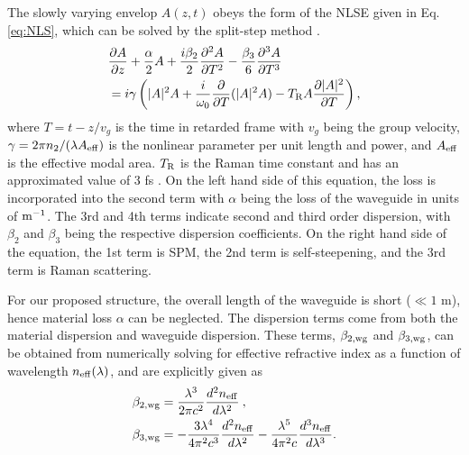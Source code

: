 The slowly varying envelop $A(z,t)$ obeys the form of the NLSE given in Eq. \ref{eq:NLS}, which can be solved by the split-step method \cite{weideman1986split}.
\begin{align}
\begin{split}
&\frac{\partial A}{\partial z}+\frac{\alpha}{2}A+\frac{i\beta_2}{2}\frac{\partial^2A}{\partial T^2}-\frac{\beta_3}{6}\frac{\partial^3 A}{\partial T^3}\\
&=i\gamma \left(|A|^2A+\frac{i}{\omega_0}\frac{\partial}{\partial T}(|A|^2A)-T_{\rm{R}}A\frac{\partial |A|^2}{\partial T}\right),
\label{eq:NLS}
\end{split}
\end{align}
where $T=t-z/v_g$ is the time in retarded frame with $v_g$ being the group velocity, $\gamma=2\pi n_2/(\lambda A_{\rm{eff}})$ is the nonlinear parameter per unit length and power, and $A_{\rm{eff}}$ is the effective modal area. $T_{\rm{R}}$ is the Raman time constant and has an approximated value of 3 fs \cite{atieh1999measuring}. On the left hand side of this equation, the loss is incorporated into the second term with $\alpha$ being the loss of the waveguide in units of $\rm{m}^{-1}$. The 3rd and 4th terms indicate second and third order dispersion, with $\beta_2$ and $\beta_3$ being the respective dispersion coefficients. On the right hand side of the equation, the 1st term is SPM, the 2nd term is self-steepening, and the 3rd term is Raman scattering.

For our proposed structure, the overall length of the waveguide is short ($\ll1$ m), hence material loss $\alpha$ can be neglected. The dispersion terms come from both the material dispersion and waveguide dispersion. These terms, $\beta_{2,\rm{wg}}$ and $\beta_{3,\rm{wg}}$, can be obtained from numerically solving for effective refractive index as a function of wavelength $n_{\rm{eff}}(\lambda)$, and are explicitly given as
\begin{align}
\beta_{2,\rm{wg}}&=\frac{\lambda^3}{2\pi c^2}\frac{d^2n_{\rm{eff}}}{d\lambda^2}\:,\\
\beta_{3,\rm{wg}}&=-\frac{3\lambda^4}{4\pi^2 c^3}\frac{d^2n_{\rm{eff}}}{d\lambda^2}-\frac{\lambda^5}{4\pi^2 c}\frac{d^3n_{\rm{eff}}}{d\lambda^3}.
\end{align}

